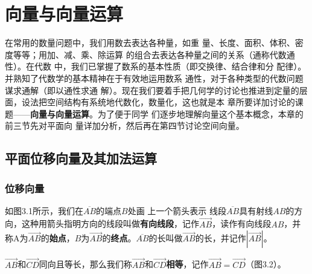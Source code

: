 \chapter{向量与向量运算}
在常用的数量问题中，我们用数去表达各种量，如重
量、长度、面积、体积、密度等等；用加、减、乘、除运算
的组合去表达各种量之间的关系（通称代数通性）。在代数
中，我们已掌握了数系的基本性质（即交换律、结合律和分
配律）。并熟知了代数学的基本精神在于有效地运用数系
通性，对于各种类型的代数问题谋求通解（即以通性求通
解）。现在我们要着手把几何学的讨论也推进到定量的层
面，设法把空间结构有系统地代数化，数量化，这也就是本
章所要详加讨论的课题——\textbf{向量与向量运算}。为了便于同学
们逐步地理解向量这个基本概念，本章的前三节先对平面向
量详加分析，然后再在第四节讨论空间向量。

\section{平面位移向量及其加法运算}

\subsection{位移向量}

如图3.1所示，我们在$\overline{AB}$的端点$B$处画
上一个箭头表示 线段$\overline{AB}$具有射线$AB$的方向，这种用箭头指明方向的线段叫做\textbf{有向线段}，记作$\Vec{AB}$，读作有向线段$AB$，并称A为$\Vec{AB}$的\textbf{始点}，$B$为$\Vec{AB}$的\textbf{终点}。$\overline{AB}$的长叫做$\Vec{AB}$的长，并记作$|\Vec{AB}|$。

$\Vec{AB}$和$\Vec{CD}$同向且等长，那么我们称$\Vec{AB}$和$\Vec{CD}$\textbf{相等}，记作$\Vec{AB}=\Vec{CD}$（图3.2）。

\begin{figure}[htp]\centering
    \begin{minipage}[t]{0.48\textwidth}
    \centering
{}
    \caption{}
    \end{minipage}
    \begin{minipage}[t]{0.48\textwidth}
    \centering
    \caption{}
    \end{minipage}
    \end{figure}

